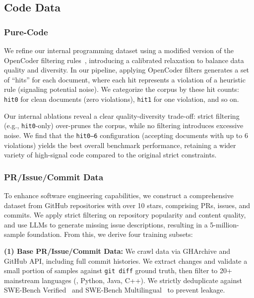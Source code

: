 \subsection{Code Data}

\subsubsection{Pure-Code}
\label{sec:pure_code}

\noindent We refine our internal programming dataset using a modified version of the OpenCoder filtering rules~\cite{huang2025opencoderopencookbooktoptier}, introducing a calibrated relaxation to balance data quality and diversity.
In our pipeline, applying OpenCoder filters generates a set of ``hits'' for each document, where each hit represents a violation of a heuristic rule (signaling potential noise).
We categorize the corpus by these hit counts: \texttt{hit0} for clean documents (zero violations), \texttt{hit1} for one violation, and so on.

\noindent Our internal ablations reveal a clear quality-diversity trade-off: strict filtering (e.g., \texttt{hit0}-only) over-prunes the corpus, while no filtering introduces excessive noise.
We find that the \texttt{hit0--6} configuration (accepting documents with up to 6 violations) yields the best overall benchmark performance, retaining a wider variety of high-signal code compared to the original strict constraints.

\subsubsection{PR/Issue/Commit Data}
\label{sec:pr_issue_data}

\noindent To enhance software engineering capabilities, we construct a comprehensive dataset from GitHub repositories with over 10 stars, comprising PRs, issues, and commits.
We apply strict filtering on repository popularity and content quality, and use LLMs to generate missing issue descriptions, resulting in a 5-million-sample foundation.
From this, we derive four training subsets:

\noindent \textbf{(1) Base PR/Issue/Commit Data:}
We crawl data via GHArchive and GitHub API, including full commit histories.
We extract changes and validate a small portion of samples against \texttt{git diff} ground truth, then filter to 20+ mainstream languages (\eg, Python, Java, C++).
We strictly deduplicate against SWE-Bench Verified~\cite{swe_verified} and SWE-Bench Multilingual~\cite{yang2025swesmith} to prevent leakage.

